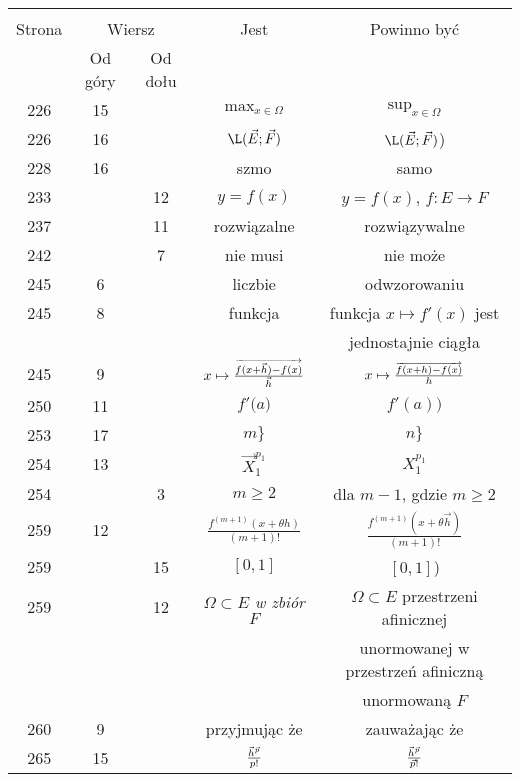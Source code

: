 \documentclass[a4paper,11pt]{article}
\newcommand{\ra}{\rightarrow}
\newcommand{\ora}{\overrightarrow}
\begin{document}
\begin{center}
  \begin{tabular}{|c|c|c|c|c|}
    \hline
    & \multicolumn{2}{c|}{} & & \\
    Strona & \multicolumn{2}{c|}{Wiersz}& Jest & Powinno być \\ \cline{2-3}
    & Od góry & Od dołu &  &  \\ \hline
    226 & 15 & & $\mathrm{max}_{ x \in \Omega }$ & $\sup_{ x \in \Omega }$ \\
    226 & 16 & & $\L( \vec{ E }; \vec{ F } )$
           & $\L( \vec{ E }; \vec{ F } )$) \\
    228 & 16 & & szmo & samo \\
    233 & & 12 & $y = f( x )$ & $y = f( x )$, $f : E \ra F$ \\
    237 & & 11 & rozwiązalne & rozwiązywalne \\
    242 & &  7 & nie musi & nie może \\
    245 &  6 & & liczbie & odwzorowaniu \\
    245 &  8 & & funkcja & funkcja $x \mapsto f'( x )$ jest \\
    & & & & jednostajnie ciągła \\
    245 &  9 & & $x \mapsto \fr{ \ora{ f( x + \vec{ h } ) - f( x ) } }
                 { \vec{ h } }$
           & $x \mapsto \fr{ \ora{ f( x + h ) - f( x ) } }{ h }$ \\
    250 & 11 & & $f'( a \Big)$ & $f'( a ) \Big)$ \\
    253 & 17 & & $m \}$ & $n \}$ \\
    254 & 13 & & $\vec{ X }^{ p_{ 1 } }_{ 1 }$ & $X^{ p_{ 1 } }_{ 1 }$ \\
    254 & &  3 & $m \geq 2$ & dla $m - 1$, gdzie $m \geq 2$ \\
    259 & 12 & & $\frac{ f^{ ( m + 1 ) }( x + \theta h ) }{ ( m + 1 )! }$
           & $\frac{ f^{ ( m + 1 ) }( x + \theta \vec{ h } ) }
             { ( m + 1 )! }$ \\
    259 & & 15 & $[ 0, 1 ]$ & $[ 0, 1 ]$) \\
    259 & & 12 & \emph{$\Omega \subset E$ w zbiór $F$}
           & $\Omega \subset E$ przestrzeni afinicznej \\
    & & & & unormowanej w przestrzeń afiniczną \\
    & & & & unormowaną $F$ \\
    260 &  9 & & przyjmując że & zauważając że \\
    265 & 15 & & $\frac{ \vec{ h }^{ \vec{ p } } }{ p! }$
           & $\frac{ \vec{ h }^{ \vec{ p } } }{ \vec{ p }! }$ \\

\end{tabular}
\end{center}
\end{document}
